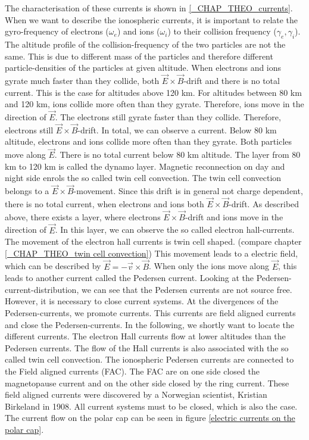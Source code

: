 \documentclass[10pt,a4paper]{article}
\begin{document}
The characterisation of these currents is shown in \ref{_CHAP_THEO_currents}. When we want to describe the ionospheric currents, it is important to relate the gyro-frequency of electrons ($\omega_e$) and ions ($\omega_i$) to their collision frequency ($\gamma_e,\gamma_i$). The altitude profile of the collision-frequency of the two particles are not the same. This is due to different mass of the particles and therefore different particle-densities of the particles at given altitude. When electrons and ions gyrate much faster than they collide, both $\vec{E}\times \vec{B}$-drift and there is no total current. This is the case for altitudes above 120 km. For altitudes between 80 km and 120 km, ions collide more often than they gyrate. Therefore, ions move in the direction of $\vec{E}$. The electrons still gyrate faster than they collide. Therefore, electrons still $\vec{E}\times \vec{B}$-drift. In total, we can observe a current. Below 80 km altitude, electrons and ions collide more often than they gyrate. Both particles move along $\vec{E}$. There is no total current below 80 km altitude.
The layer from 80 km to 120 km is called the dynamo layer. 
Magnetic reconnection on day and night side enrols the so called twin cell convection. The twin cell convection belongs to a $\vec{E}\times \vec{B}$-movement. Since this drift is in general not charge dependent, there is no total current, when electrons and ions both $\vec{E}\times \vec{B}$-drift. As described above, there exists a layer, where electrons $\vec{E}\times \vec{B}$-drift and ions move in the direction of $\vec{E}$. In this layer, we can observe the so called electron hall-currents. The movement of the electron hall currents is twin cell shaped. (compare chapter \ref{_CHAP_THEO_twin cell convection}) This movement leads to a electric field, which can be described by $\vec{E}=-\vec{v}\times \vec{B}$. When only the ions move along $\vec{E}$, this leads to another current called the Pedersen current. Looking at the Pedersen-current-distribution, we can see that the Pedersen currents are not source free. However, it is necessary to close current systems. At the divergences of the Pedersen-currents, we promote currents. This currents are field aligned currents and close the Pedersen-currents. 
In the following, we shortly want to locate the different currents. 
The electron Hall currents flow at lower altitudes than the Pedersen currents. The flow of the Hall currents is also associated with the so called twin cell convection.
The ionospheric Pedersen currents are connected to the Field aligned currents (FAC). The FAC are on one side closed the magnetopause current and on the other
side closed by the ring current. These field aligned currents were discovered by a Norwegian scientist, Kristian Birkeland in 1908. All current systems must to be closed, which is also the case. The current flow on the polar cap can be seen in figure \ref{electric currents on the polar cap}.
\end{document}
